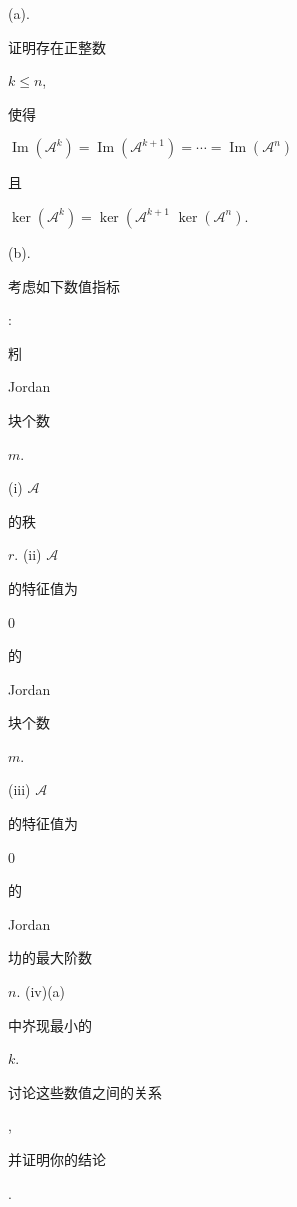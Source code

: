 \documentclass[10pt]{article}
\begin{document}
(a). \begin{CJK}{UTF8}{mj}证明存在正整数\end{CJK} $k \leq n$, \begin{CJK}{UTF8}{mj}使得\end{CJK} $\operatorname{Im}\left(\mathscr{A}^{k}\right)=\operatorname{Im}\left(\mathscr{A}^{k+1}\right)=\cdots=\operatorname{Im}\left(\mathscr{A}^{n}\right)$ \begin{CJK}{UTF8}{mj}且\end{CJK} $\operatorname{ker}\left(\mathscr{A}^{k}\right)=\operatorname{ker}\left(\mathscr{A}^{k+1}\right.$ $\operatorname{ker}\left(\mathscr{A}^{n}\right)$.

(b). \begin{CJK}{UTF8}{mj}考虑如下数值指标\end{CJK}:

\begin{CJK}{UTF8}{mj}粌\end{CJK}Jordan \begin{CJK}{UTF8}{mj}块个数\end{CJK} $m$.

(i) $\mathscr{A}$ \begin{CJK}{UTF8}{mj}的秩\end{CJK} $r$. (ii) $\mathscr{A}$ \begin{CJK}{UTF8}{mj}的特征值为\end{CJK} 0 \begin{CJK}{UTF8}{mj}的\end{CJK} Jordan\begin{CJK}{UTF8}{mj}块个数\end{CJK} $m$.

(iii) $\mathscr{A}$ \begin{CJK}{UTF8}{mj}的特征值为\end{CJK} 0 \begin{CJK}{UTF8}{mj}的\end{CJK} Jordan \begin{CJK}{UTF8}{mj}㘦的最大阶数\end{CJK} $n$. (iv)(a) \begin{CJK}{UTF8}{mj}中岕现最小的\end{CJK} $k$.

\begin{CJK}{UTF8}{mj}讨论这些数值之间的关系\end{CJK}, \begin{CJK}{UTF8}{mj}并证明你的结论\end{CJK}.
\end{document}
